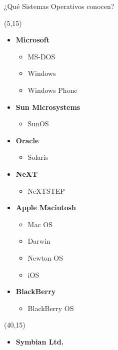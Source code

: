 \documentclass[aspectratio=169]{beamer}
\begin{document}
\begin{frame}{¿Qué Sistemas Operativos conocen?}
    \begin{textblock}{80}(5,15)
        \scriptsize
        \begin{itemize}
        \item[] \textbf{Microsoft}
        \begin{itemize} \scriptsize 
            \item MS-DOS
            \item Windows
            \item Windows Phone
        \end{itemize}    
        \item[] \textbf{Sun Microsystems}
        \begin{itemize} \scriptsize 
            \item SunOS
        \end{itemize}    
        \item[] \textbf{Oracle}
        \begin{itemize} \scriptsize 
            \item Solaris
        \end{itemize}
        \item[] \textbf{NeXT}
        \begin{itemize} \scriptsize 
            \item NeXTSTEP
        \end{itemize}
        \item[] \textbf{Apple Macintosh}
        \begin{itemize} \scriptsize 
            \item Mac OS
            \item Darwin
            \item Newton OS
            \item iOS
        \end{itemize}
        \item[] \textbf{BlackBerry}
        \begin{itemize} \scriptsize 
            \item BlackBerry OS
        \end{itemize}
        \end{itemize}
    \end{textblock}
    \begin{textblock}{80}(40,15)
        \scriptsize
        \begin{itemize}
        \item[] \textbf{Symbian Ltd.}

\end{itemize}
\end{textblock}
\end{frame}
\end{document}
